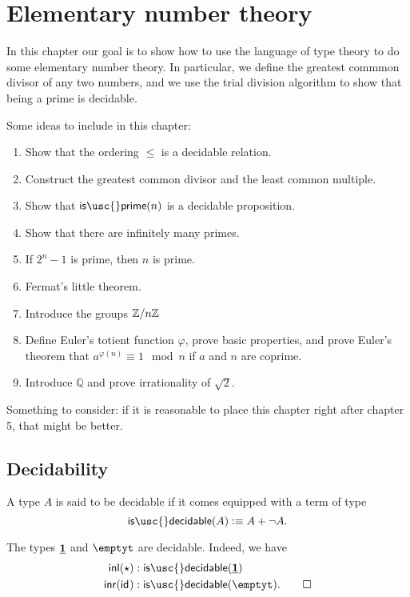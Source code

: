 \chapter{Elementary number theory}

In this chapter our goal is to show how to use the language of type theory to do some elementary number theory. In particular, we define the greatest commmon divisor of any two numbers, and we use the trial division algorithm to show that being a prime is decidable.

Some ideas to include in this chapter:
\begin{enumerate}
\item Show that the ordering $\leq$ is a decidable relation.
\item Construct the greatest common divisor and the least common multiple.
\item Show that $\mathsf{is\usc{}prime}(n)$ is a decidable proposition.
\item Show that there are infinitely many primes.
\item If $2^n-1$ is prime, then $n$ is prime.
\item Fermat's little theorem.
\item Introduce the groups $\mathbb{Z}/n\mathbb{Z}$
\item Define Euler's totient function $\varphi$, prove basic properties, and prove Euler's theorem that $a^{\varphi(n)}\equiv 1 \mod n$ if $a$ and $n$ are coprime.
\item Introduce $\mathbb{Q}$ and prove irrationality of $\sqrt{2}$.
\end{enumerate}

Something to consider: if it is reasonable to place this chapter right after chapter 5, that might be better.


\section{Decidability}

\begin{defn}
  A type $A$ is said to be decidable if it comes equipped with a term of type
  \begin{equation*}
    \mathsf{is\usc{}decidable}(A)\defeq A+\neg A.
  \end{equation*}
\end{defn}

\begin{eg}
  The types $\underline{\mathbf{1}}$ and $\emptyt$ are decidable. Indeed, we have
  \begin{align*}
    \inl(\ttt) & :\mathsf{is\usc{}decidable}(\unit) \\
    \inr(\idfunc) & : \mathsf{is\usc{}decidable}(\emptyt).\qedhere
  \end{align*}
\end{eg}


